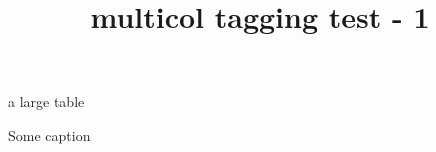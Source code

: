 \documentclass{article}
\title{multicol tagging test - 1}
\begin{document}
\begin{multicols}{2}
\kant[1-2]
\begin{table*}
a large table
\caption{Some caption}
\end{table*}
\kant[3-4]
\end{multicols}
\end{document}
